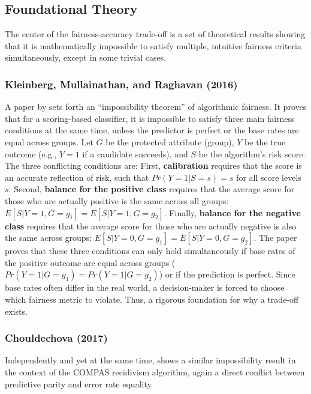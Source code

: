 \subsection{Foundational Theory}

The center of the fairness-accuracy trade-off is a set of theoretical results showing that it is mathematically impossible to satisfy multiple, intuitive fairness criteria simultaneously, except in some trivial cases.

\subsubsection{Kleinberg, Mullainathan, and Raghavan (2016)}

A paper by \citet{Kleinberg2017} sets forth an ``impossibility theorem'' of algorithmic fairness. It proves that for a scoring-based classifier, it is impossible to satisfy three main fairness conditions at the same time, unless the predictor is perfect or the base rates are equal across groups. Let $G$ be the protected attribute (group), $Y$ be the true outcome (e.g., $Y=1$ if a candidate succeeds), and $S$ be the algorithm's risk score. The three conflicting conditions are:
First, \textbf{calibration} requires that the score is an accurate reflection of risk, such that $Pr(Y=1 | S=s) = s$ for all score levels $s$. Second, \textbf{balance for the positive class} requires that the average score for those who are actually positive is the same across all groups: $E[S | Y=1, G=g_1] = E[S | Y=1, G=g_2]$. Finally, \textbf{balance for the negative class} requires that the average score for those who are actually negative is also the same across groups: $E[S | Y=0, G=g_1] = E[S | Y=0, G=g_2]$.
The paper proves that these three conditions can only hold simultaneously if base rates of the positive outcome are equal across groups ($Pr(Y=1 | G=g_1) = Pr(Y=1 | G=g_2)$) or if the prediction is perfect. Since base rates often differ in the real world, a decision-maker is forced to choose which fairness metric to violate. Thus, a rigorous foundation for why a trade-off exists.

\subsubsection{Chouldechova (2017)}

Independently and yet at the same time, \citet{Chouldechova2017} shows a similar impossibility result in the context of the COMPAS recidivism algorithm, again a direct conflict between predictive parity and error rate equality.


